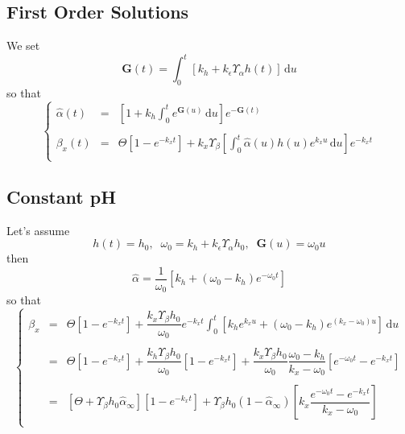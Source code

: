\documentclass[aps,onecolumn,12pt]{revtex4}
\newcommand{\ig}{\ensuremath{\mathbf{G}}}
\begin{document}
\subsection{First Order Solutions}
We set
\begin{equation}
	\ig(t) = \int_0^{t} \left[ k_h + k_\epsilon \Upsilon_\alpha h(t) \right] \,\mathrm{d}u
\end{equation}
so that
\begin{equation}
\left\lbrace
\begin{array}{rcl}
	\hat\alpha(t) & = & \displaystyle \left[1+ k_h\int_0^t e^{\ig(u)}\,\mathrm{d} u\right] e^{-\ig(t)} \\
	\\
	\beta_x(t)    & = & \displaystyle \Theta \left[ 1-e^{-k_x t} \right] + k_x \Upsilon_\beta \left[ \int_0^t  \hat\alpha(u) h(u) e^{k_x u} \,\mathrm{d} u\right] e^{-k_xt}\\
\end{array}
\right.
\end{equation}

\subsection{Constant pH}
Let's assume
\begin{equation}
	h(t) = h_0, \;\;\omega_0 = k_h + k_\epsilon \Upsilon_\alpha h_0,\;\; \ig(u) = \omega_0 u
\end{equation}
then
\begin{equation}
	\hat\alpha = \dfrac{1}{\omega_0} \left[ k_h + \left(\omega_0-k_h\right)e^{-\omega_0 t}\right]
\end{equation}
so that
\begin{equation}
\left\lbrace
\begin{array}{rcl}
	\beta_x & = & \displaystyle \Theta \left[ 1-e^{-k_x t} \right] + \dfrac{k_x \Upsilon_\beta h_0 }{\omega_0} e^{-k_xt} 
	\int_0^t \left[ k_h e^{k_xu} + \left(\omega_0-k_h\right)e^{ (k_x-\omega_0) u} \right] \,\mathrm{d} u  \\
	\\
	& = & \displaystyle \Theta \left[ 1-e^{-k_x t} \right] + \dfrac{k_h \Upsilon_\beta h_0 }{\omega_0}\left[ 1-e^{-k_x t} \right]
	+ \dfrac{k_x \Upsilon_\beta h_0 }{\omega_0} \dfrac{\omega_0-k_h}{k_x-\omega_0} \left[ e^{-\omega_0t} - e^{-k_xt}\right]\\
	\\
	& = & \left[\Theta + \Upsilon_\beta h_0 \hat\alpha_\infty \right]\left[ 1-e^{-k_x t} \right] 
	+ \Upsilon_\beta h_0 \left(1-\hat\alpha_\infty\right) \left[ k_x \dfrac{e^{-\omega_0t} - e^{-k_xt}}{k_x-\omega_0}\right]
	 \\
\end{array}
\right.
\end{equation}
\end{document}
